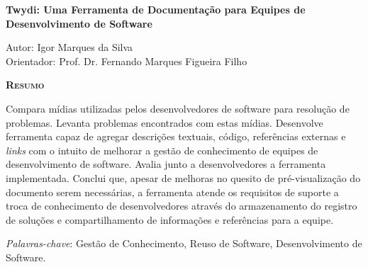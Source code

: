 \begin{center}
	{\Large{\textbf{Twydi: Uma Ferramenta de Documentação para Equipes de Desenvolvimento de Software}}}
\end{center}

\vspace{1cm}

\begin{flushright}
	Autor: Igor Marques da Silva\\
	Orientador: Prof. Dr. Fernando Marques Figueira Filho
\end{flushright}

\vspace{1cm}

\begin{center}
	\Large{\textsc{\textbf{Resumo}}}
\end{center}

\noindent Compara mídias utilizadas pelos desenvolvedores de software para resolução de problemas. Levanta problemas encontrados com estas mídias. Desenvolve ferramenta capaz de agregar descrições textuais, código, referências externas e \textit{links} com o intuito de melhorar a gestão de conhecimento de equipes de  desenvolvimento de software. Avalia junto a desenvolvedores a ferramenta implementada. Conclui que, apesar de melhoras no quesito de pré-visualização do documento serem necessárias, a ferramenta atende os requisitos de suporte a troca de conhecimento de desenvolvedores através do armazenamento do registro de soluções e compartilhamento de informações e  referências para a equipe.

\noindent\textit{Palavras-chave}: Gestão de Conhecimento, Reuso de Software, Desenvolvimento de Software.
